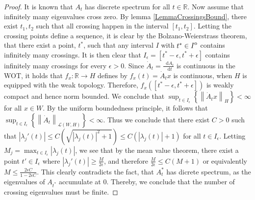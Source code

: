 \documentclass[a4paper,11pt]{article}
\newcommand{\norm}[1]{\left\lVert #1 \right\rVert}
\newcommand{\abs}[1]{\left\lvert #1 \right\rvert}
\newcommand{\interior}[1]{%
	{\kern0pt#1}^{\mathrm{o}}%
}
\newcommand*\diff{\mathop{}\!\mathrm{d}}
\newcommand{\R}{\mathbb{R}}
\begin{document}
\begin{proof}
	It is known that $ A_t $ has discrete spectrum for all $ t\in\R $. Now assume that infinitely many eigenvalues cross zero. By lemma \ref{LemmaCrossingsBound}, there exist $ t_1,t_2 $ such that all crossing happen in the interval $ [t_1,t_2] $. Letting the crossing points define a sequence, it is clear by the Bolzano-Weierstrass theorem, that there exist a point, $ t^* $, such that any interval $ I $ with $ t^*\in \interior{I} $ contains infinitely many crossings. It is then clear that $ I_\epsilon=[t^*-\epsilon,t^*+\epsilon] $ contains infinitely many crossings for every $ \epsilon>0 $. Since $ \dot{A}_t=\frac{\diff A_t}{\diff t} $ is continuous in the WOT, it holds that $ f_x:\R\to H $ defines by $ f_x(t)=\dot{A}_tx $ is continuous, when $ H $ is equipped with the weak topology. Therefore, $ f_x([t^*-\epsilon,t^*+\epsilon]) $ is weakly compact and hence norm bounded. We conclude that $ \sup_{t\in I_\epsilon}\left\{\norm{\dot{A}_t x}_H\right\}<\infty $ for all $ x\in W $. By the uniform boundedness principle, it follows that $ \sup_{t\in I_\epsilon}\left\{\norm{\dot{A}_t}_{\mathcal{L}(W,H)}\right\}<\infty $. Thus we conclude that there exist $ C>0 $ such that $ \abs{\lambda_j'(t)}\leq C\left(\sqrt{\abs{\lambda_j(t)}^2+1}\right)\leq C(\abs{\lambda_j(t)}+1)  $ for all $ t\in I_\epsilon $. Letting $ M_j= \max_{t\in I_\epsilon}\abs{\lambda_j(t)} $, we see that by the mean value theorem, there exist a point $ t'\in I_\epsilon $ where $ \abs{\lambda_j'(t)}\geq \frac{M}{2\epsilon} $, and therefore $ \frac{M}{2\epsilon}\leq C(M+1) $ or equivalently $ M\leq \frac{2\epsilon C}{1-2\epsilon C}   $. This clearly contradicts the fact, that $ A_t^* $ has dicrete spectrum, as the eigenvalues of $ A_{t^*} $ accumulate at $ 0 $. Thereby, we conclude that the number of crossing eigenvalues must be finite.
\end{proof}
\end{document}
